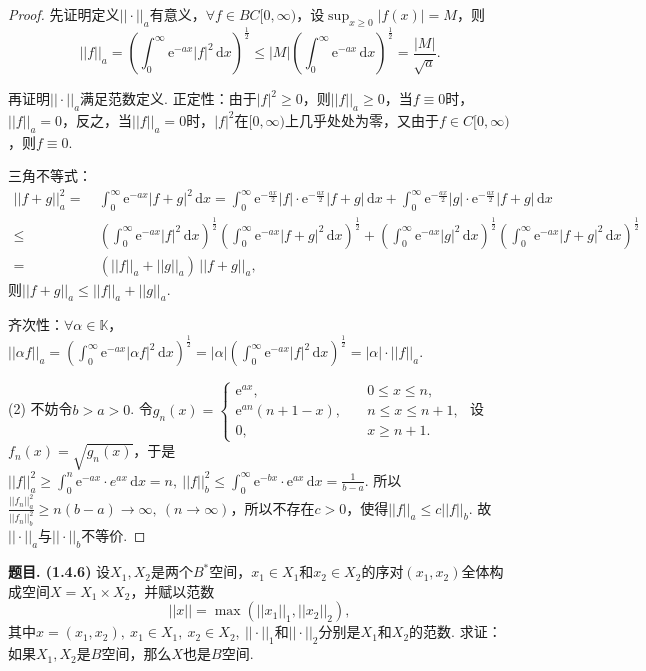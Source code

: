 \documentclass[12pt, a4paper, oneside]{ctexart}
\newcounter{problem}  %
\newenvironment{problem}[1][]{\stepcounter{problem}\par\noindent\textbf{题目\arabic{problem}. #1}}{\smallskip\par}
\let\leq=\leqslant %
\let\geq=\geqslant %
\def\K{\mathbb{K}}          %
\def\d{\mathrm{d}}          %
\def\e{\mathrm{e}}          %
\def\add{\vspace{1ex}}      %
\begin{document}
\begin{proof}
    先证明定义$||\cdot ||_a$有意义，$\forall f\in BC[0,\infty)$，设$\sup_{x\geq 0}|f(x)| = M$，则
    \begin{equation*}
    ||f||_a=\left(\int_0^\infty \e^{-ax}|f|^2\,\d x\right)^{\frac{1}{2}}\leq |M|\left(\int_0^\infty \e^{-ax}\,\d x\right)^{\frac{1}{2}}=\frac{|M|}{\sqrt{a}}.
    \end{equation*}

    再证明$||\cdot ||_a$满足范数定义. 正定性：由于$|f|^2\geq 0$，则$||f||_a\geq 0$，当$f\equiv 0$时，$||f||_a = 0$，反之，当$||f||_a=0$时，$|f|^2$在$[0,\infty)$上几乎处处为零，又由于$f\in C[0,\infty)$，则$f\equiv 0$.

    三角不等式：
    \begin{align*}
        ||f+g||_a^2 =&\ \int_0^{\infty}\e^{-ax}|f+g|^2\,\d x = \int_0^{\infty}\e^{-\frac{ax}{2}}|f|\cdot \e^{-\frac{ax}{2}}|f+g|\,\d x+\int_0^{\infty}\e^{-\frac{ax}{2}}|g|\cdot \e^{-\frac{ax}{2}}|f+g|\,\d x\\
        \leq&\ \left(\int_0^\infty \e^{-ax}|f|^2\,\d x\right)^{\frac{1}{2}}\left(\int_0^{\infty}\e^{-ax}|f+g|^2\,\d x\right)^{\frac{1}{2}}+\left(\int_0^\infty \e^{-ax}|g|^2\,\d x\right)^{\frac{1}{2}}\left(\int_0^{\infty}\e^{-ax}|f+g|^2\,\d x\right)^{\frac{1}{2}}\\
        =&\ (||f||_a+||g||_a)\,||f+g||_a,
    \end{align*}
    则$||f+g||_a\leq ||f||_a+||g||_a$.

    齐次性：$\forall \alpha \in \K$，$||\alpha f||_a=\left(\int_0^\infty \e^{-ax}|\alpha f|^2\,\d x\right)^{\frac{1}{2}}=|\alpha|\left(\int_0^\infty \e^{-ax}|f|^2\,\d x\right)^{\frac{1}{2}}=|\alpha|\cdot ||f||_a$.

    (2) 不妨令$b> a > 0$. 令$g_n(x) = \begin{cases}
        \e^{ax},&\quad 0\leq x\leq n,\\
        \e^{an}(n+1-x),&\quad n\leq x\leq n+1,\\
        0,&\quad x\geq n+1.
    \end{cases}$
    设$f_n(x) = \sqrt{g_n(x)}$，于是\add $||f||_a^2\geq \int_0^n\e^{-ax}\cdot e^{ax}\,\d x=n,\ ||f||_b^2\leq \int_0^\infty \e^{-bx}\cdot\e^{ax}\,\d x=\frac{1}{b-a}$. 所以$\frac{||f_n||_a^2}{||f_n||_b^2}\geq n(b-a)\to\infty,\ (n\to\infty)$，所以不存在$c > 0$，使得$||f||_a\leq c||f||_b$. 故$||\cdot||_a$与$||\cdot||_b$不等价.
\end{proof}
\begin{problem}[(1.4.6)]
    设$X_1,X_2$是两个$B^*$空间，$x_1\in X_1$和$x_2\in X_2$的序对$(x_1,x_2)$全体构成空间$X=X_1\times X_2$，并赋以范数
    \begin{equation*}
        ||x|| = \max(||x_1||_1,||x_2||_2),
    \end{equation*}
    其中$x=(x_1,x_2),\ x_1\in X_1,\ x_2\in X_2,\ ||\cdot ||_1$和$||\cdot ||_2$分别是$X_1$和$X_2$的范数. 求证：如果$X_1,X_2$是$B$空间，那么$X$也是$B$空间.
\end{problem}
\end{document}
